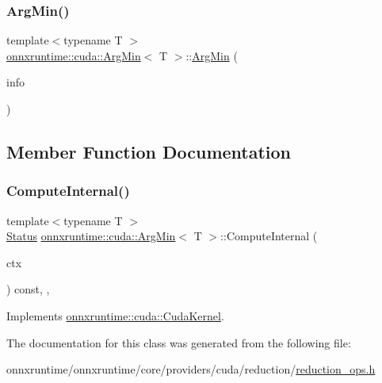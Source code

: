 \subsubsection{\texorpdfstring{Arg\+Min()}{ArgMin()}}
{\footnotesize\ttfamily template$<$typename T $>$ \\
\mbox{\hyperlink{classonnxruntime_1_1cuda_1_1ArgMin}{onnxruntime\+::cuda\+::\+Arg\+Min}}$<$ T $>$\+::\mbox{\hyperlink{classonnxruntime_1_1cuda_1_1ArgMin}{Arg\+Min}} (\begin{DoxyParamCaption}\item[{const \mbox{\hyperlink{classonnxruntime_1_1OpKernelInfo}{Op\+Kernel\+Info}} \&}]{info }\end{DoxyParamCaption})\hspace{0.3cm}{\ttfamily [inline]}}



\subsection{Member Function Documentation}
\mbox{\label{classonnxruntime_1_1cuda_1_1ArgMin_a2284dff807b92224f079e97210383b64}} 
\subsubsection{\texorpdfstring{Compute\+Internal()}{ComputeInternal()}}
{\footnotesize\ttfamily template$<$typename T $>$ \\
\mbox{\hyperlink{classonnxruntime_1_1common_1_1Status}{Status}} \mbox{\hyperlink{classonnxruntime_1_1cuda_1_1ArgMin}{onnxruntime\+::cuda\+::\+Arg\+Min}}$<$ T $>$\+::Compute\+Internal (\begin{DoxyParamCaption}\item[{\mbox{\hyperlink{classonnxruntime_1_1OpKernelContext}{Op\+Kernel\+Context}} $\ast$}]{ctx }\end{DoxyParamCaption}) const\hspace{0.3cm}{\ttfamily [inline]}, {\ttfamily [override]}, {\ttfamily [virtual]}}



Implements \mbox{\hyperlink{classonnxruntime_1_1cuda_1_1CudaKernel_aca7af04ae448017d6023d30bba231ebb}{onnxruntime\+::cuda\+::\+Cuda\+Kernel}}.



The documentation for this class was generated from the following file\+:\begin{DoxyCompactItemize}
\item 
onnxruntime/onnxruntime/core/providers/cuda/reduction/\mbox{\hyperlink{cuda_2reduction_2reduction__ops_8h}{reduction\+\_\+ops.\+h}}\end{DoxyCompactItemize}

